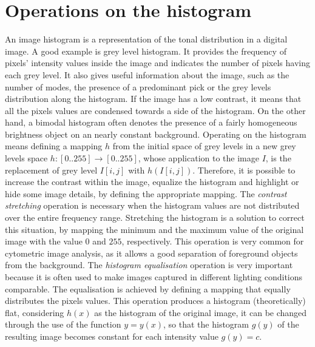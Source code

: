 \documentclass[final,a4paper,12pt,english]{UnicaPhdThesis3}
\begin{document}
\section{Operations on the histogram}\label{histop} %
An image histogram is a representation of the tonal distribution in a digital image. A good example is grey level histogram. It provides the frequency of pixels' intensity values inside the image and indicates the number of pixels having each grey level. 
It also gives useful information about the image, such as the number of modes, the presence of a predominant pick or the grey levels distribution along the histogram. If the image has a low contrast, it means that all the pixels values ​are condensed towards a side of the histogram. On the other hand, a bimodal histogram often denotes the presence of a fairly homogeneous brightness object on an nearly constant background. Operating on the histogram means defining a mapping $h$ from the initial space of grey levels in a new grey levels space $h: [0..255] \rightarrow [0..255]$, whose application to the image $I$, is the replacement of grey level $I[i, j]$ with $h(I[i, j])$. Therefore, it is possible to increase the contrast within the image, equalize the histogram and highlight or hide some image details, by defining the appropriate mapping.
The \textit{contrast stretching} operation is necessary when the histogram values are not distributed over the entire frequency range. Stretching the histogram is a solution to correct this situation, by mapping the minimum and the maximum value of the original image with the value $0$ and $255$, respectively. This operation is very common for cytometric image analysis, as it allows a good separation of foreground objects from the background.
The \textit{histogram equalisation} operation is very important because it is often used to make images captured in different lighting conditions comparable. The equalisation is achieved by defining a mapping that equally distributes the pixels values. This operation produces a histogram (theoretically) flat, considering $h(x)$ as the histogram of the original image, it can be changed through the use of the function $y = y(x)$, so that the histogram $g(y)$ of the resulting image becomes constant for each intensity value $g(y) = c$.
\end{document}
